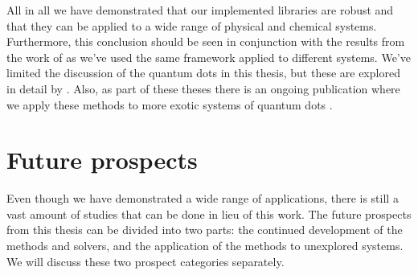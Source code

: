     All in all we have demonstrated that our implemented libraries are robust
    and that they can be applied to a wide range of physical and chemical
    systems.
    Furthermore, this conclusion should be seen in conjunction with the results
    from the work of \citeauthor{greg-winther} \cite{greg-winther} as we've used
    the same framework applied to different systems.
    We've limited the discussion of the quantum dots in this thesis, but these
    are explored in detail by \citeauthor{greg-winther}.
    Also, as part of these theses there is an ongoing publication where we apply
    these methods to more exotic systems of quantum dots \cite{td-quantum-dots}.


    \section{Future prospects}
        \label{sec:future-work}
        Even though we have demonstrated a wide range of applications, there is
        still a vast amount of studies that can be done in lieu of this work.
        The future prospects from this thesis can be divided into two parts: the
        continued development of the methods and solvers, and the application of
        the methods to unexplored systems.
        We will discuss these two prospect categories separately.

